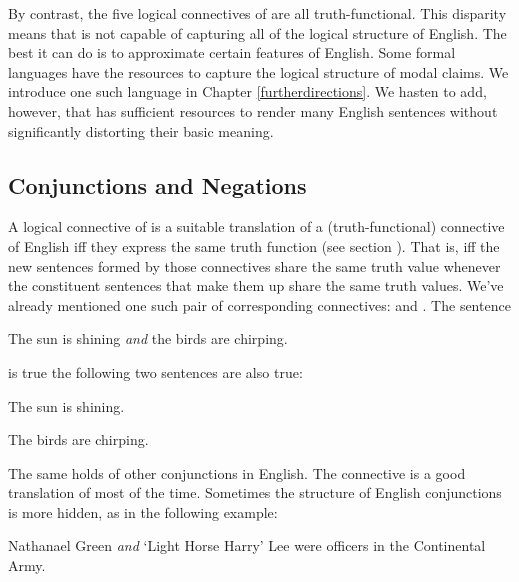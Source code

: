 By contrast, the five logical connectives of \GSL{} are all truth-functional.
This disparity means that \GSL{} is not capable of capturing all of the logical structure of English.
The best it can do is to approximate certain features of English.
Some formal languages have the resources to capture the logical structure of modal claims.
We introduce one such language in Chapter \ref{furtherdirections}.
We hasten to add, however, that \GSL{} has sufficient resources to render many English sentences without significantly distorting their basic meaning.

\subsection{Conjunctions and Negations}\label{Translating GSLConjunctionsAndNegations}

A logical connective of \GSL{} is a suitable translation of a (truth-functional) connective of English iff they express the same truth function (see section ).
That is, iff the new sentences formed by those connectives share the same truth value whenever the constituent sentences that make them up share the same truth values.
We've already mentioned one such pair of corresponding connectives:  and \mention{$\WEDGE$}.
The sentence

\begin{menumerate}
	\item\label{GSLTransConjunction1} The sun is shining \emph{and} the birds are chirping.
\end{menumerate}

\noindent{}is true \Iff the following two sentences are also true:

\begin{menumerate}
	\item The sun is shining.
	\item The birds are chirping.
\end{menumerate}

\noindent{}The same holds of other conjunctions in English.  The \GSL{} connective \mention{$\WEDGE$} is a good translation of  most of the time.
Sometimes the structure of English conjunctions is more hidden, as in the following example:

\begin{menumerate}
	\item\label{GSLTransConjunction2} Nathanael Green \emph{and} `Light Horse Harry' Lee were officers in the Continental Army.
\end{menumerate}

